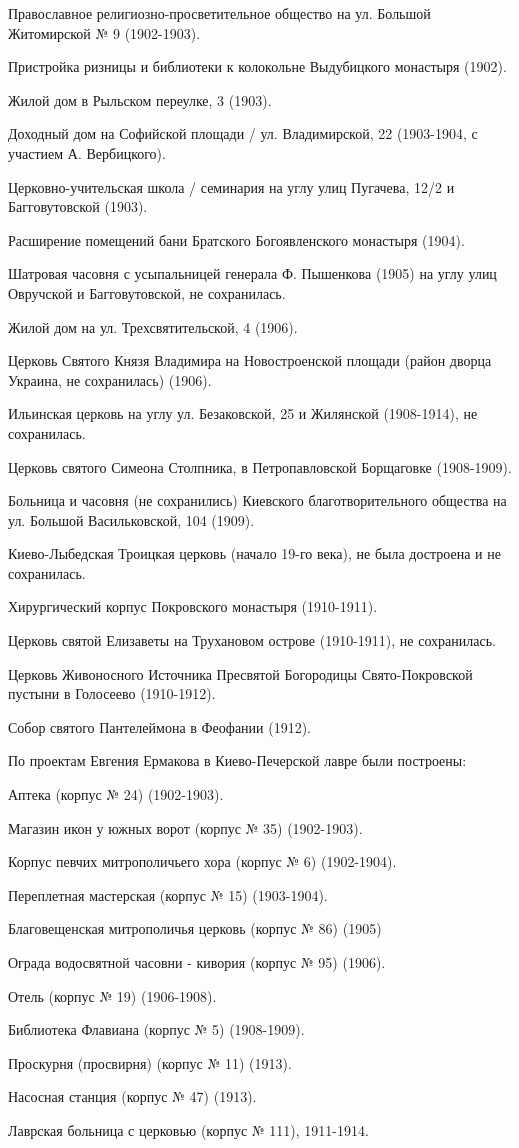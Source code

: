 Православное религиозно-просветительное общество на ул. Большой Житомирской № 9 (1902-1903).

Пристройка ризницы и библиотеки к колокольне Выдубицкого монастыря (1902).

Жилой дом в Рыльском переулке, 3 (1903).

Доходный дом на Софийской площади / ул. Владимирской, 22 (1903-1904, с участием А. Вербицкого).

Церковно-учительская школа / семинария на углу улиц Пугачева, 12/2 и Багговутовской (1903).

Расширение помещений бани Братского Богоявленского монастыря (1904).

Шатровая часовня с усыпальницей генерала Ф. Пышенкова (1905) на углу улиц Овручской и Багговутовской, не сохранилась.

Жилой дом на ул. Трехсвятительской, 4 (1906).

Церковь Святого Князя Владимира на Новостроенской площади (район дворца Украина, не сохранилась) (1906).

Ильинская церковь на углу ул. Безаковской, 25 и Жилянской (1908-1914), не сохранилась.

Церковь святого Симеона Столпника, в Петропавловской Борщаговке (1908-1909).

Больница и часовня (не сохранились) Киевского благотворительного общества на ул. 
Большой Васильковской, 104 (1909).

Киево-Лыбедская Троицкая церковь (начало 19-го века), не была достроена и не сохранилась.

Хирургический корпус Покровского монастыря (1910-1911).

Церковь святой Елизаветы на Трухановом 
острове (1910-1911), не сохранилась.

Церковь Живоносного Источника Пресвятой Богородицы Свято-Покровской пустыни в Голосеево (1910-1912).

Собор святого Пантелеймона в Феофании (1912).

По проектам Евгения Ермакова в Киево-Печерской лавре были построены:

Аптека (корпус № 24) (1902-1903).

Магазин икон у южных ворот (корпус № 35) (1902-1903).

Корпус певчих митрополичьего хора (корпус № 6) (1902-1904).

Переплетная мастерская (корпус № 15) (1903-1904).

Благовещенская митрополичья церковь (корпус № 86) (1905)

Ограда водосвятной часовни - кивория (корпус № 95) (1906).

Отель (корпус № 19) (1906-1908).

Библиотека Флавиана (корпус № 5) (1908-1909).

Проскурня (просвирня) (корпус № 11) (1913).

Насосная станция (корпус № 47) (1913).

Лаврская больница с церковью (корпус № 111), 1911-1914.
